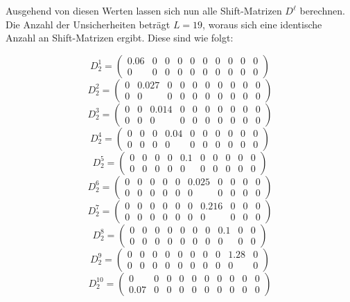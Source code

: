 \documentclass[a4paper,12pt]{article}
\begin{document}
Ausgehend von diesen Werten lassen sich nun alle Shift-Matrizen $D^\ell$ berechnen. Die Anzahl der Unsicherheiten betr\"agt $L = 19$, woraus sich eine identische Anzahl an Shift-Matrizen ergibt. Diese sind wie folgt:

\[
D^1_2 = \begin{pmatrix}
    0.06 & 0 & 0 & 0 & 0 & 0 & 0 & 0 & 0 & 0 \\
    0 & 0 & 0 & 0 & 0 & 0 & 0 & 0 & 0 & 0
\end{pmatrix}
\]
\[
D^2_2 = \begin{pmatrix}
    0 & 0.027 & 0 & 0 & 0 & 0 & 0 & 0 & 0 & 0 \\
    0 & 0 & 0 & 0 & 0 & 0 & 0 & 0 & 0 & 0
\end{pmatrix}
\]
\[
D^3_2 = \begin{pmatrix}
    0 & 0 & 0.014 & 0 & 0 & 0 & 0 & 0 & 0 & 0 \\
    0 & 0 & 0 & 0 & 0 & 0 & 0 & 0 & 0 & 0
\end{pmatrix}
\]
\[
D^4_2 = \begin{pmatrix}
    0 & 0 & 0 & 0.04 & 0 & 0 & 0 & 0 & 0 & 0 \\
    0 & 0 & 0 & 0 & 0 & 0 & 0 & 0 & 0 & 0
\end{pmatrix}
\]
\[
D^5_2 = \begin{pmatrix}
    0 & 0 & 0 & 0 & 0.1 & 0 & 0 & 0 & 0 & 0 \\
    0 & 0 & 0 & 0 & 0 & 0 & 0 & 0 & 0 & 0
\end{pmatrix}
\]
\[
D^6_2 = \begin{pmatrix}
    0 & 0 & 0 & 0 & 0 & 0.025 & 0 & 0 & 0 & 0 \\
    0 & 0 & 0 & 0 & 0 & 0 & 0 & 0 & 0 & 0
\end{pmatrix}
\]
\[
D^7_2 = \begin{pmatrix}
    0 & 0 & 0 & 0 & 0 & 0 & 0.216 & 0 & 0 & 0 \\
    0 & 0 & 0 & 0 & 0 & 0 & 0 & 0 & 0 & 0
\end{pmatrix}
\]
\[
D^8_2 = \begin{pmatrix}
    0 & 0 & 0 & 0 & 0 & 0 & 0 & 0.1 & 0 & 0 \\
    0 & 0 & 0 & 0 & 0 & 0 & 0 & 0 & 0 & 0
\end{pmatrix}
\]
\[
D^9_2 = \begin{pmatrix}
    0 & 0 & 0 & 0 & 0 & 0 & 0 & 0 & 1.28 & 0 \\
    0 & 0 & 0 & 0 & 0 & 0 & 0 & 0 & 0 & 0
\end{pmatrix}
\]
\[
D^{10}_2 = \begin{pmatrix}
    0 & 0 & 0 & 0 & 0 & 0 & 0 & 0 & 0 & 0 \\
    0.07 & 0 & 0 & 0 & 0 & 0 & 0 & 0 & 0 & 0
\end{pmatrix}
\]
\end{document}
